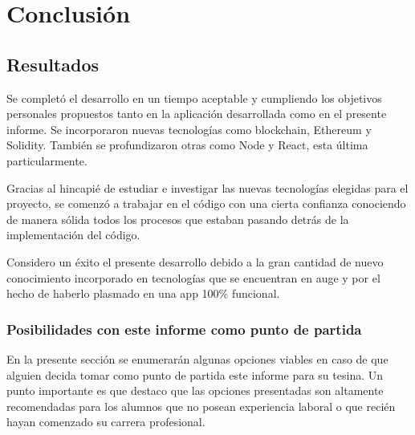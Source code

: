 
\chapter{Conclusión}

\ifpdf
    \graphicspath{{Chapter5/Figs/}{Chapter5/Figs/PDF/}{Chapter5/Figs/}}
\else
    \graphicspath{{Chapter5/Figs/}{Chapter5/Figs/}}
\fi


\section{Resultados}
Se completó el desarrollo en un tiempo aceptable y cumpliendo los objetivos personales propuestos
tanto en la aplicación desarrollada como en el presente informe. Se incorporaron nuevas tecnologías
como blockchain, Ethereum y Solidity. También se profundizaron otras como Node y React, esta última
particularmente.

Gracias al hincapié de estudiar e investigar las nuevas tecnologías elegidas para el proyecto, se
comenzó a trabajar en el código con una cierta confianza conociendo de manera sólida todos los
procesos que estaban pasando detrás de la implementación del código.

Considero un éxito el presente desarrollo debido a la gran cantidad de nuevo conocimiento
incorporado en tecnologías que se encuentran en auge y por el hecho de haberlo plasmado en una app
100\% funcional.


\subsection{Posibilidades con este informe como punto de partida}
En la presente sección se enumerarán algunas opciones viables en caso de que alguien decida tomar
como punto de partida este informe para su tesina. Un punto importante es que destaco que las
opciones presentadas son altamente recomendadas para los alumnos que no posean experiencia laboral 
o que recién hayan comenzado su carrera profesional.

